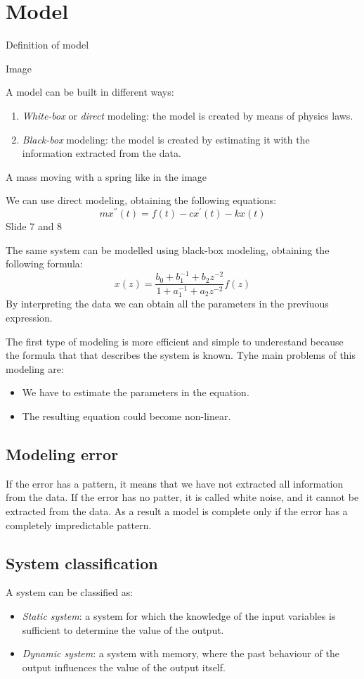 \section{Model}

Definition of model 

Image 

A model can be built in different ways: 
\begin{enumerate}
    \item \textit{White-box} or \textit{direct} modeling: the model is created by means of physics laws. 
    \item \textit{Black-box} modeling: the model is created by estimating it with the information extracted from the data. 
\end{enumerate}


\begin{example}
    A mass moving with a spring like in the image 


    We can use direct modeling, obtaining the following equations: 
    \[mx^{''}(t)=f(t)-cx^{'}(t)-kx(t)\]
    Slide 7 and 8

    The same system can be modelled using black-box modeling, obtaining the following formula: 
    \[x(z)=\dfrac{b_0+b_1^{-1}+b_2z^{-2}}{1+a_1^{-1}+a_2z^{-2}}f(z)\]
    By interpreting the data we can obtain all the parameters in the previuous expression.
\end{example}
The first type of modeling is more efficient and simple to underestand because the formula that that describes the system is known. 
Tyhe main problems of this modeling are: 
\begin{itemize}
    \item We have to estimate the parameters in the equation. 
    \item The resulting equation could become non-linear. 
\end{itemize}

\subsection{Modeling error}

If the error has a pattern, it means that we have not extracted all information from the data. 
If the error has no patter, it is called white noise, and it cannot be extracted from the data. 
As a result a model is complete only if the error has a completely impredictable pattern. 

\subsection{System classification}
A system can be classified as: 
\begin{itemize}
    \item \textit{Static system}: a system for which the knowledge of the input variables is sufficient to determine the value of the output. 
    \item \textit{Dynamic system}: a system with memory, where the past behaviour of the output influences the value of the output itself. 
\end{itemize}

